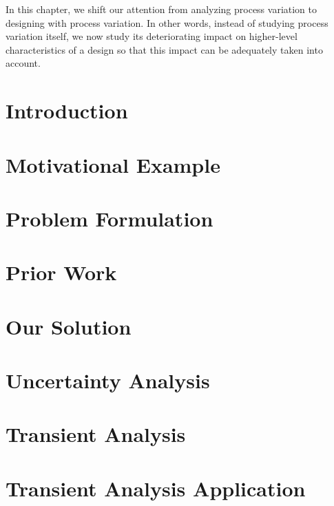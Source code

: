 In this chapter, we shift our attention from analyzing process variation to
designing with process variation. In other words, instead of studying process
variation itself, we now study its deteriorating impact on higher-level
characteristics of a design so that this impact can be adequately taken into
account.

\section{Introduction}

\section{Motivational Example}

\section{Problem Formulation}

\section{Prior Work}

\section{Our Solution}

\section{Uncertainty Analysis}

\section{Transient Analysis}

\section{Transient Analysis Application}

